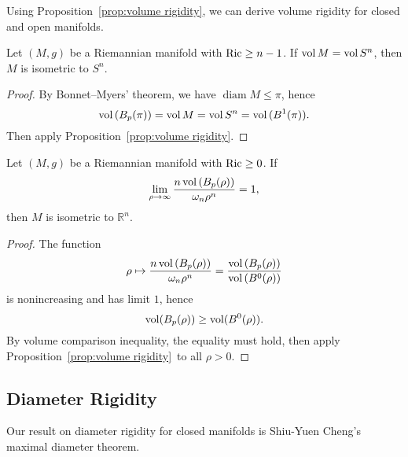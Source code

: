 Using Proposition~\ref{prop:volume rigidity}, we can derive volume rigidity for closed and open manifolds.

\begin{thm}
    Let $(M,g)$ be a Riemannian manifold with $\operatorname{Ric}\geq n-1$.
    If $\operatorname{vol}{M}=\operatorname{vol}{S^n}$, then $M$ is isometric to $S^n$.
\end{thm}
\begin{proof}
    By Bonnet--Myers' theorem, we have $\operatorname{diam}{M}\leq\pi$, hence
    \[\operatorname{vol}{(B_p(\pi))}=\operatorname{vol}{M}=\operatorname{vol}{S^n}=\operatorname{vol}{(B^1(\pi))}.\]
    Then apply Proposition~\ref{prop:volume rigidity}.
\end{proof}

\begin{thm}
    Let $(M,g)$ be a Riemannian manifold with $\operatorname{Ric}\geq 0$.
    If
    \[\lim_{\rho\to\infty}\frac{n\operatorname{vol}{(B_p(\rho))}}{\omega_n\rho^n}=1,\]
    then $M$ is isometric to $\mathbb{R}^n$.
\end{thm}
\begin{proof}
    The function
    \[\rho\mapsto\frac{n\operatorname{vol}{(B_p(\rho))}}{\omega_n\rho^n}=\frac{\operatorname{vol}{(B_p(\rho))}}{\operatorname{vol}{(B^0(\rho))}}\]
    is nonincreasing and has limit $1$, hence
    \[\operatorname{vol}(B_p(\rho))\geq\operatorname{vol}(B^0(\rho)).\]
    By volume comparison inequality, the equality must hold, then apply Proposition~\ref{prop:volume rigidity}~to all $\rho>0$.
\end{proof}

\subsection{Diameter Rigidity}

Our result on diameter rigidity for closed manifolds is Shiu-Yuen Cheng's maximal diameter theorem.

